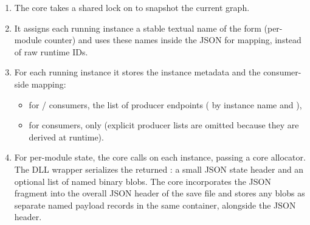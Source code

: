 \begin{enumerate}
    \item The core takes a shared lock on  to snapshot the current graph.
    \item It assigns each running instance a stable textual name of the form  (per-module counter) and uses these names inside the JSON for mapping, instead of raw runtime IDs.
    \item For each running instance it stores the instance metadata and the consumer-side mapping:
    \begin{itemize}
        \item for / consumers, the list of producer endpoints ( by instance name and ),
        \item for  consumers, only  (explicit producer lists are omitted because they are derived at runtime).
    \end{itemize}
    \item For per-module state, the core calls  on each instance, passing a core allocator. The DLL wrapper serializes the returned : a small JSON state header and an optional list of named binary blobs. The core incorporates the JSON fragment into the overall JSON header of the save file and stores any blobs as separate named payload records in the same container, alongside the JSON header.
\end{enumerate}

